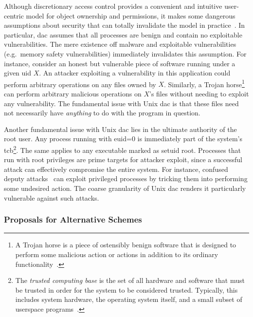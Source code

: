 \documentclass[
  fontsize=12pt,
  titlepage=firstiscover,
  paper=letter,
oneside,
  cleardoublepage=plain,
  parskip=half-,
  DIV=10,
  parindent,
  appendixprefix,
  chapterprefix,
  listof=totoc,
]{scrbook}
\begin{document}
Although discretionary access control provides a convenient and intuitive user-centric
model for object ownership and permissions, it makes some dangerous assumptions about
security that can totally invalidate the model in
practice~\cite{shu2016_security_isolation_study}. In particular, \gls{dac} assumes that all
processes are benign and contain no exploitable vulnerabilities. The mere existence off
malware and exploitable vulnerabilities (e.g.\ memory safety vulnerabilities) immediately
invalidates this assumption. For instance, consider an honest but vulnerable piece of
software running under a given \gls{uid} $X$. An attacker exploiting a vulnerability in
this application could perform arbitrary operations on any files owned by $X$. Similarly,
a Trojan horse\footnote{A Trojan horse is a piece of ostensibly benign software that
is designed to perform some malicious action or actions in addition to its ordinary
functionality~\cite{van_oorschot2020_tools_jewels}.}~\cite{shu2016_security_isolation_study,
van_oorschot2020_tools_jewels} can perform arbitrary malicious operations on $X$'s files
without needing to exploit any vulnerability. The fundamental issue with Unix \gls{dac} is
that these files need not necessarily have \textit{anything} to do with the program in
question.

Another fundamental issue with Unix \gls{dac} lies in the ultimate authority of the root
user. Any process running with \gls{euid}=0 is immediately part of the system's
\gls{tcb}\footnote{The \textit{trusted computing base} is the set of all hardware
and software that must be trusted in order for the system to be considered trusted.
Typically, this includes system hardware, the operating system itself, and a small subset
of userspace programs~\cite{jaeger2008_os_security}.}. The same applies to any executable
marked as setuid root. Processes that run with root privileges are prime targets for
attacker exploit, since a successful attack can effectively compromise the entire system.
For instance, confused deputy attacks~\cite{hardy1988_confused_deputy,
shu2016_security_isolation_study} can exploit privileged processes by tricking them into
performing some undesired action. The coarse granularity of Unix \gls{dac} renders it
particularly vulnerable against such attacks.

\subsubsection*{Proposals for Alternative Schemes}
\end{document}
